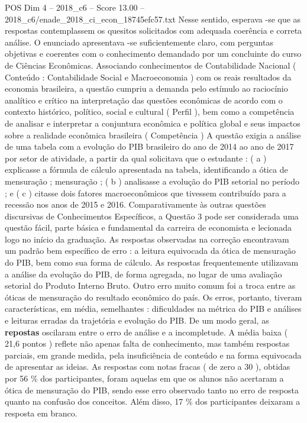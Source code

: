 \begin{textsample}{POS Dim 4 – 2018\_c6 – Score 13.00 – 2018\_c6/enade\_2018\_ci\_econ\_18745efc57.txt}
Nesse sentido, esperava -se que as respostas contemplassem os quesitos solicitados com adequada coerência e correta análise.
O enunciado apresentava -se suficientemente claro, com perguntas objetivas e coerentes com o conhecimento demandado por um concluinte do curso de Ciências Econômicas.
Associando conhecimentos de Contabilidade Nacional ( Conteúdo : Contabilidade Social e Macroeconomia ) com os reais resultados da economia brasileira, a questão cumpriu a demanda pelo estímulo ao raciocínio analítico e crítico na interpretação das questões econômicas de acordo com o contexto histórico, político, social e cultural ( Perfil ), bem como a competência de analisar e interpretar a conjuntura econômica e política global e seus impactos sobre a realidade econômica brasileira ( Competência ) A questão exigia a análise de uma tabela com a evolução do PIB brasileiro do ano de 2014 ao ano de 2017 por setor de atividade, a partir da qual solicitava que o estudante : ( a ) explicasse a fórmula de cálculo apresentada na tabela, identificando a ótica de mensuração ; mensuração ; ( b ) analisasse a evolução do PIB setorial no período ; e ( c ) citasse dois fatores macroeconômicos que tivessem contribuído para a recessão nos anos de 2015 e 2016.
Comparativamente às outras questões discursivas de Conhecimentos Específicos, a Questão 3 pode ser considerada uma questão fácil, parte básica e fundamental da carreira de economista e lecionada logo no início da graduação.
As respostas observadas na correção encontravam um padrão bem específico de erro : a leitura equivocada da ótica de mensuração do PIB, bem como sua forma de cálculo.
As respostas frequentemente utilizavam a análise da evolução do PIB, de forma agregada, no lugar de uma avaliação setorial do Produto Interno Bruto.
Outro erro muito comum foi a troca entre as óticas de mensuração do resultado econômico do país.
Os erros, portanto, tiveram características, em média, semelhantes : dificuldades na métrica do PIB e análises e leituras erradas da trajetória e evolução do PIB.
De um modo geral, as \textbf{repostas} oscilaram entre o erro de análise e a incompletude.
A média baixa ( 21,6 pontos ) reflete não apenas falta de conhecimento, mas também respostas parciais, em grande medida, pela insuficiência de conteúdo e na forma equivocada de apresentar as ideias.
As respostas com notas fracas ( de zero a 30 ), obtidas por 56 \% dos participantes, foram aquelas em que os alunos não acertaram a ótica de mensuração do PIB, sendo esse erro observado tanto no erro de resposta quanto na confusão dos conceitos.
Além disso, 17 \% dos participantes deixaram a resposta em branco.

\end{textsample}
